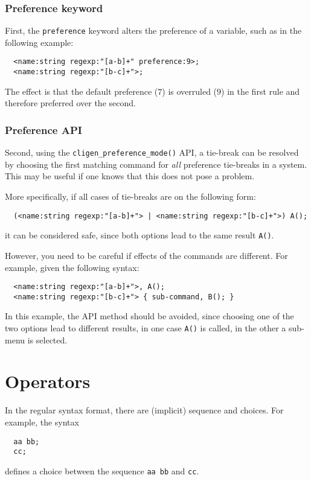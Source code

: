 \documentclass[a4paper, 10pt] {article}
\begin{document}
\subsubsection{Preference keyword}

First, the {\tt preference} keyword alters the preference of a variable, such as in the following example:
\begin{verbatim}
  <name:string regexp:"[a-b]+" preference:9>;
  <name:string regexp:"[b-c]+">;
\end{verbatim}

The effect is that the default preference ($7$) is overruled ($9$) in the first rule and therefore preferred over the second.

\subsubsection{Preference API}

Second, using the {\tt cligen\_preference\_mode()} API, a tie-break can be
resolved by choosing the first matching command for {\em all}
preference tie-breaks in a system. This may be useful if one knows
that this does not pose a problem.

More specifically, if all cases of tie-breaks are on the following form:
\begin{verbatim}
  (<name:string regexp:"[a-b]+"> | <name:string regexp:"[b-c]+">) A();
\end{verbatim}

it can be considered safe, since both options lead to the same result {\tt A()}.

However, you need to be careful if effects of the commands are different. For example, given the following syntax:
\begin{verbatim}
  <name:string regexp:"[a-b]+">, A();
  <name:string regexp:"[b-c]+"> { sub-command, B(); }
\end{verbatim}

In this example, the API method should be avoided, since choosing one of the two 
options lead to different results, in one case {\tt A()} is called, in the other a sub-menu is selected.

\section{Operators}
\label{sec:operators}

In the regular syntax format, there are (implicit) sequence and choices. For example, the syntax
\begin{verbatim}
  aa bb;
  cc;
\end{verbatim}
defines a choice between the sequence {\tt aa bb} and {\tt cc}.
\end{document}
